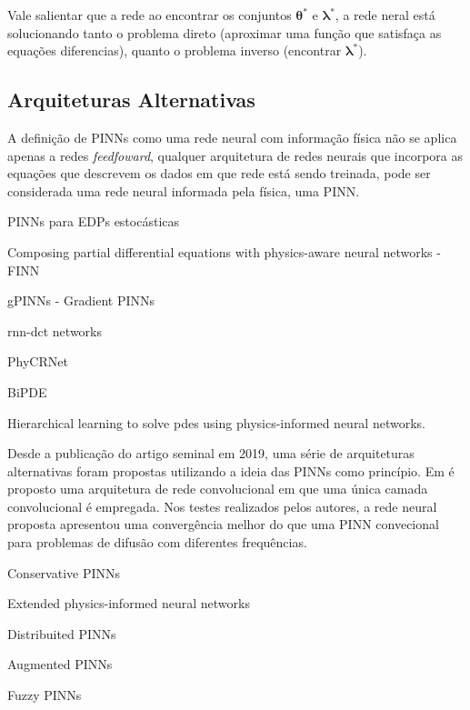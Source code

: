Vale salientar que a rede ao encontrar os conjuntos $\boldsymbol{\theta}^*$
e $\boldsymbol{\lambda}^*$, a rede neral está solucionando tanto o problema
direto (aproximar uma função que satisfaça as equações diferencias), quanto o 
problema inverso (encontrar $\boldsymbol{\lambda}^*$). 

\subsection{Arquiteturas Alternativas}

A definição de PINNs como uma rede neural com informação física não se aplica
apenas a redes \textit{feedfoward}, qualquer arquitetura de redes neurais
que incorpora as equações que descrevem os dados em que rede está sendo treinada, 
pode ser considerada uma rede neural informada pela física, uma PINN.

PINNs para EDPs estocásticas \cite{zhang-etal:2020-stochastic-pde-pinns}
 
Composing partial differential equations with physics-aware neural networks - FINN

gPINNs - Gradient PINNs \cite{mohammadian-etal:2023-gradient-enhanced}

rnn-dct networks \cite{benjamin-etal:2022-rnn-dct-networks}

PhyCRNet \cite{ren-etal:2022-phycrnet}

BiPDE \cite{pakravan-et:2021-bipde}

Hierarchical learning to solve pdes using physics-informed neural networks.
\cite{han-etal:2023-hierarchical-learning}

Desde a publicação do artigo seminal em 2019, uma série de arquiteturas 
alternativas foram propostas utilizando a ideia das PINNs como princípio.
Em \cite{shi-etal:24-convnet} é proposto uma arquitetura de rede convolucional
em que uma única camada convolucional é empregada. Nos testes realizados pelos
autores, a rede neural proposta apresentou uma convergência melhor do que uma 
PINN convecional para problemas de difusão com diferentes frequências.

Conservative PINNs \cite{jagtap-etal:2020-convervative-pinns}

Extended physics-informed neural networks \cite{jagtap-etal:2020-extended-pinns}

Distribuited PINNs \cite{dwivedi:2019-distributed-pinns}

Augmented PINNs \cite{hu-etal:2023-augmented-pinns}

Fuzzy PINNs \cite{fugh-etal:2022-fuzzy-pinns}

